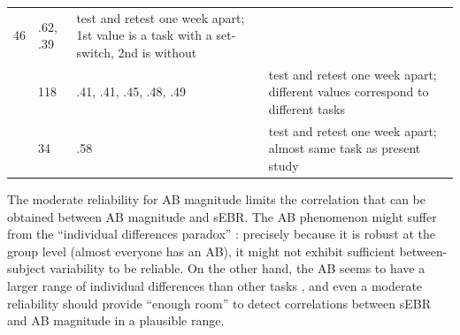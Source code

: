 \documentclass[11pt,]{memoir}
\begin{document}
\begin{longtable}[]{@{}llll@{}}
\begin{minipage}[t]{0.03\columnwidth}
46\strut
\end{minipage} & \begin{minipage}[t]{0.15\columnwidth}\raggedright
.62, .39\strut
\end{minipage} & \begin{minipage}[t]{0.51\columnwidth}\raggedright
test and retest one week apart; 1st value is a task with a set-switch, 2nd is without\strut
\end{minipage}\tabularnewline
\begin{minipage}[t]{0.19\columnwidth}\raggedright
\textcite{Dale2013}\strut
\end{minipage} & \begin{minipage}[t]{0.03\columnwidth}\raggedright
118\strut
\end{minipage} & \begin{minipage}[t]{0.15\columnwidth}\raggedright
.41, .41, .45, .48, .49\strut
\end{minipage} & \begin{minipage}[t]{0.51\columnwidth}\raggedright
test and retest one week apart; different values correspond to different tasks\strut
\end{minipage}\tabularnewline
\begin{minipage}[t]{0.19\columnwidth}\raggedright
\textcite{London2015}\strut
\end{minipage} & \begin{minipage}[t]{0.03\columnwidth}\raggedright
34\strut
\end{minipage} & \begin{minipage}[t]{0.15\columnwidth}\raggedright
.58\strut
\end{minipage} & \begin{minipage}[t]{0.51\columnwidth}\raggedright
test and retest one week apart; almost same task as present study\strut
\end{minipage}\tabularnewline
\bottomrule
\end{longtable}

\endgroup

The moderate reliability for AB magnitude limits the correlation that can be obtained between AB magnitude and sEBR. The AB phenomenon might suffer from the ``individual differences paradox'' \autocite{Hedge2018}: precisely because it is robust at the group level (almost everyone has an AB), it might not exhibit sufficient between-subject variability to be reliable. On the other hand, the AB seems to have a larger range of individual differences than other tasks \autocite{Willems2016}, and even a moderate reliability should provide ``enough room'' to detect correlations between sEBR and AB magnitude in a plausible range.
\end{document}
